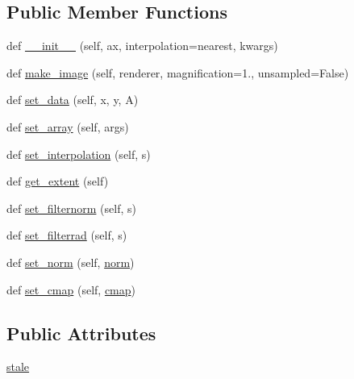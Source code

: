 \subsection*{Public Member Functions}
\begin{DoxyCompactItemize}
\item 
def \hyperlink{classmatplotlib_1_1image_1_1NonUniformImage_af3107b6a860dcaba7fb433ccd03e2b98}{\+\_\+\+\_\+init\+\_\+\+\_\+} (self, ax, interpolation=\textquotesingle{}nearest\textquotesingle{}, kwargs)
\item 
def \hyperlink{classmatplotlib_1_1image_1_1NonUniformImage_a21348da29198f2420992b471be9c4444}{make\+\_\+image} (self, renderer, magnification=1., unsampled=False)
\item 
def \hyperlink{classmatplotlib_1_1image_1_1NonUniformImage_add40808002116e23ed1f224b9f8a68c8}{set\+\_\+data} (self, x, y, A)
\item 
def \hyperlink{classmatplotlib_1_1image_1_1NonUniformImage_a1d9a5e2aa5924c8d966a151786841bea}{set\+\_\+array} (self, args)
\item 
def \hyperlink{classmatplotlib_1_1image_1_1NonUniformImage_a130661e1f3000a3052dd64e2307e3f85}{set\+\_\+interpolation} (self, s)
\item 
def \hyperlink{classmatplotlib_1_1image_1_1NonUniformImage_a5e8ab93baab69af944b7b5ea354d89fb}{get\+\_\+extent} (self)
\item 
def \hyperlink{classmatplotlib_1_1image_1_1NonUniformImage_a6e1e006491f0f280c8d6fee51d997a3e}{set\+\_\+filternorm} (self, s)
\item 
def \hyperlink{classmatplotlib_1_1image_1_1NonUniformImage_a1fa840053b2ed1725b0bc1be2466a842}{set\+\_\+filterrad} (self, s)
\item 
def \hyperlink{classmatplotlib_1_1image_1_1NonUniformImage_a2595ef94b5a51d9809eb00621bafa0eb}{set\+\_\+norm} (self, \hyperlink{classmatplotlib_1_1cm_1_1ScalarMappable_a5507985e8c38feaa3d6972f75db09f73}{norm})
\item 
def \hyperlink{classmatplotlib_1_1image_1_1NonUniformImage_a69c19136aec4d238a39fd3f639e50c5f}{set\+\_\+cmap} (self, \hyperlink{classmatplotlib_1_1cm_1_1ScalarMappable_a3684ebc12a81cc6f2599c0babd1d40af}{cmap})
\end{DoxyCompactItemize}
\subsection*{Public Attributes}
\begin{DoxyCompactItemize}
\item 
\hyperlink{classmatplotlib_1_1image_1_1NonUniformImage_a5782766d5b1aa2a02024e9056ebac51c}{stale}
\end{DoxyCompactItemize}
